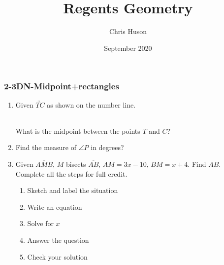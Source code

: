 \documentclass[12pt, twoside]{article}
\title{Regents Geometry}
\author{Chris Huson}
\date{September 2020}
\begin{document}
\subsubsection*{2-3DN-Midpoint+rectangles}
\begin{enumerate}
\item Given $\overleftrightarrow{TC}$ as shown on the number line. \\[20pt] %
     \\ \bigskip
    What is the midpoint between the points $T$ and $C$? \vspace{2cm}  

\item Find the measure of $\angle P$ in degrees? \vspace{0.25cm}
    \begin{center}
    \end{center}  \vspace{1cm}

\item Given $\overline{AMB}$, $M$ bisects $\overline{AB}$, $AM=3x-10$, $BM=x+4$. Find ${AB}$.\\
    Complete all the steps for full credit. \smallskip
      \begin{enumerate}
        \item Sketch and label the situation
        \item Write an equation
        \item Solve for $x$
        \item Answer the question
        \item Check your solution
      \end{enumerate}


\end{enumerate}
\end{document}
